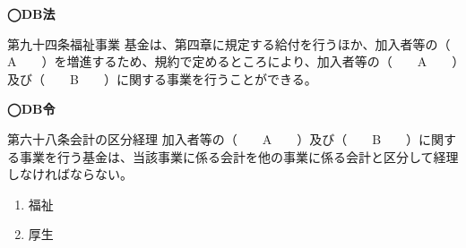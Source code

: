 \begin{fillblank}[自作 \ 2026/10/4]
  \begin{lawstructure}
    \noindent \textbf{◯DB法}
    \begin{lawarticle}{第九十四条}{福祉事業}
      基金は、第四章に規定する給付を行うほか、加入者等の（　　A　　）を増進するため、規約で定めるところにより、加入者等の（　　A　　）及び（　　B　　）に関する事業を行うことができる。
    \end{lawarticle}

    \noindent \textbf{◯DB令}
    \begin{lawarticle}{第六十八条}{会計の区分経理}
      加入者等の（　　A　　）及び（　　B　　）に関する事業を行う基金は、当該事業に係る会計を他の事業に係る会計と区分して経理しなければならない。
    \end{lawarticle}
  \end{lawstructure}
\end{fillblank}

\begin{answerbox}
 \begin{enumerate}[A:]
    \item 福祉
    \item 厚生
  \end{enumerate}
\end{answerbox}


